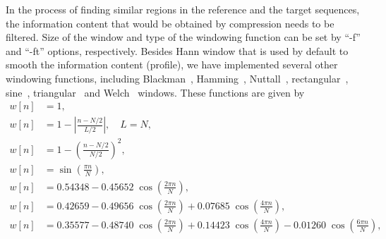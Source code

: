 In the process of finding similar regions in the reference and the target sequences, the information content that would be obtained by compression needs to be filtered. Size of the window and type of the windowing function can be set by ``-f'' and ``-ft'' options, respectively.
Besides Hann window that is used by default to smooth the information content (profile), we have implemented several other windowing functions, including Blackman~\cite{blackman1959particular}, Hamming~\cite{tukey1949measuring}, Nuttall~\cite{nuttall1981some}, rectangular~\cite{oppenheim1999discrete}, sine~\cite{harris1978use}, triangular~\cite{bartlett1950periodogram} and Welch~\cite{welch1967use} windows. These functions are given by
\begin{align}
  w[n] & = 1,
  \tag*{(rectangular)}                                                                                                                                        \\
  w[n] & = 1-\left|\tfrac {n-N/2}{L/2}\right|, \quad L=N,
  \tag*{(triangular/Bartlett)}                                                                                                                                \\
  w[n] & = 1-\left(\tfrac {n-N/2}{N/2}\right)^{2},
  \tag*{(Welch)}                                                                                                                                              \\
  w[n] & = \sin \left(\tfrac {\pi n}{N}\right),
  \tag*{(sine)}                                                                                                                                               \\
  w[n] & = 0.54348-0.45652\;\cos \left(\tfrac {2\pi n}{N}\right),
  \tag*{(Hamming)}                                                                                                                                            \\
  w[n] & = 0.42659-0.49656\;\cos \left(\tfrac {2\pi n}{N}\right)+0.07685\;\cos \left(\tfrac {4\pi n}{N}\right),
  \tag*{(Blackman)}                                                                                                                                           \\
  w[n] & = 0.35577-0.48740\;\cos \left(\tfrac {2\pi n}{N}\right)+0.14423\;\cos \left(\tfrac {4\pi n}{N}\right)-0.01260\;\cos \left(\tfrac {6\pi n}{N}\right),
  \tag*{(Nuttall)}                                                                                                                                            \\
\end{align}
